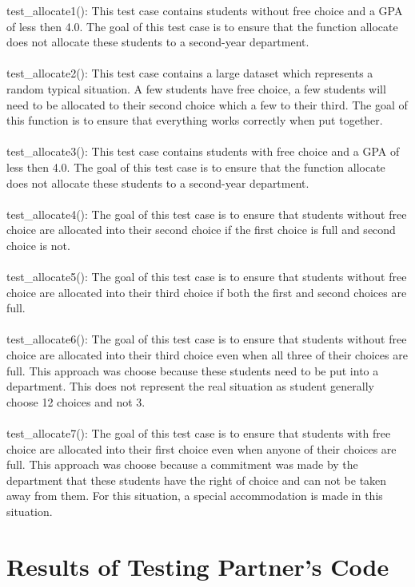 \documentclass[12pt]{article}
\begin{document}
test\_allocate1(): This test case contains students without free choice and a GPA of less then 4.0. The goal of this test case is to ensure that the function allocate does not allocate these students to a second-year department.\\\\
test\_allocate2(): This test case contains a large dataset which represents a random typical situation. A few students have free choice, a few students will need to be allocated to their second choice which a few to their third. The goal of this function is to ensure that everything works correctly when put together.\\\\
test\_allocate3(): This test case contains students with free choice and a GPA of less then 4.0. The goal of this test case is to ensure that the function allocate does not allocate these students to a second-year department.\\ \\
test\_allocate4(): The goal of this test case is to ensure that students without free choice are allocated into their second choice if the first choice is full and second choice is not.\\ \\ 
test\_allocate5(): The goal of this test case is to ensure that students without free choice are allocated into their third choice if both the first and second choices are full.\\\\
test\_allocate6(): The goal of this test case is to ensure that students without free choice are allocated into their third choice even when all three of their choices are full. This approach was choose because these students need to be put into a department. This does not represent the real situation as student generally choose 12 choices and not 3.\\\\
test\_allocate7(): The goal of this test case is to ensure that students with free choice are allocated into their first choice even when anyone of their choices are full. This approach was choose because a commitment was made by the department that these students have the right of choice and can not be taken away from them. For this situation, a special accommodation is made in this situation.\\




\section{Results of Testing Partner's Code}
\end{document}
